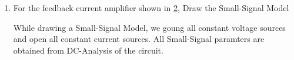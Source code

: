 \begin{enumerate}[label=\thesubsection.\arabic*.,ref=\thesubsection.\theenumi]

\item For the feedback current amplifier shown in \ref{fig:Input}, Draw the Small-Signal Model
\begin{figure}[h!]
	\begin{center}
		\resizebox{\columnwidth/2}{!}{}
	\end{center}
	\caption{}
	\label{fig:Input}
\end{figure}

\solution
While drawing a Small-Signal Model, we goung all constant voltage sources and open all constant current sources. All Small-Signal paramters are obtained from DC-Analysis of the circuit.
\begin{figure}[h!]
	\begin{center}
		\resizebox{\columnwidth/2}{!}{}
	\end{center}
	\caption{}
	\label{fig:Input}
\end{figure}


\end{enumerate}
